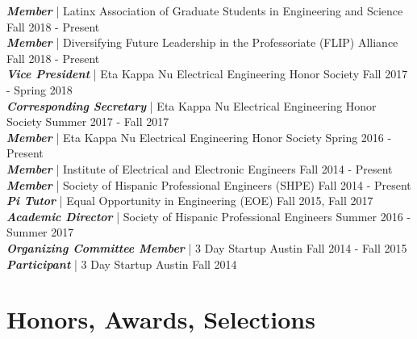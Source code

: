 \documentclass[line]{res}
\begin{document}
\begin{resume}
{\sl \textbf{Member}} | Latinx Association of Graduate Students in Engineering and Science \hfill Fall 2018 - Present
\\
{\sl \textbf{Member}} | Diversifying Future Leadership in the Professoriate (FLIP) Alliance \hfill Fall 2018 - Present
\\
{\sl \textbf{Vice President}} | Eta Kappa Nu Electrical Engineering Honor Society \hfill Fall 2017 - Spring 2018
\\
{\sl \textbf{Corresponding Secretary}} | Eta Kappa Nu Electrical Engineering Honor Society \hfill Summer 2017 - Fall 2017
\\
{\sl \textbf{Member}} | Eta Kappa Nu Electrical Engineering Honor Society \hfill Spring 2016 - Present
\\
{\sl \textbf{Member}} | Institute of Electrical and Electronic Engineers \hfill Fall 2014 - Present
\\
{\sl \textbf{Member}} | Society of Hispanic Professional Engineers (SHPE) \hfill Fall 2014 - Present
\\
{\sl \textbf{Pi Tutor}} | Equal Opportunity in Engineering (EOE) \hfill Fall 2015, Fall 2017
\\
{\sl \textbf{Academic Director}} | Society of Hispanic Professional Engineers \hfill Summer 2016 - Summer 2017
\\
{\sl \textbf{Organizing Committee Member}} | 3 Day Startup Austin \hfill Fall 2014 - Fall 2015
\\
{\sl \textbf{Participant}} | 3 Day Startup Austin \hfill Fall 2014

\section{\Large{Honors, Awards, Selections}}
\label{sec:honors}
\vspace{2mm}


\end{resume}
\end{document}

